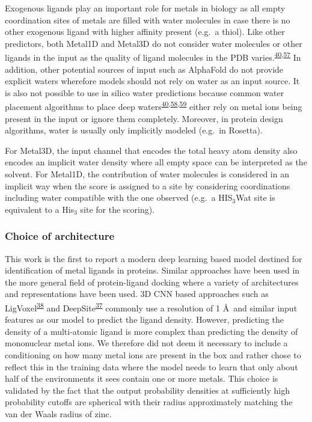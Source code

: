 \documentclass[ lineno,
  9pt]{elife}
\begin{document}
Exogenous ligands play an important role for metals in biology as all empty coordination sites of metals are filled with water molecules in case there is no other exogenous ligand with higher affinity present (e.g.~a thiol). Like other predictors, both Metal1D and Metal3D do not consider water molecules or other ligands in the input as the quality of ligand molecules in the PDB varies.\textsuperscript{\protect\hyperlink{ref-9UNjBvCL}{40},\protect\hyperlink{ref-NifwNdQd}{57}} In addition, other potential sources of input such as AlphaFold do not provide explicit waters wherefore models should not rely on water as an input source. It is also not possible to use in silico water predictions because common water placement algorithms to place deep waters\textsuperscript{\protect\hyperlink{ref-9UNjBvCL}{40},\protect\hyperlink{ref-10C4imKQR}{58},\protect\hyperlink{ref-izkvZoLX}{59}} either rely on metal ions being present in the input or ignore them completely. Moreover, in protein design algorithms, water is usually only implicitly modeled (e.g.~in Rosetta).

For Metal3D, the input channel that encodes the total heavy atom density also encodes an implicit water density where all empty space can be interpreted as the solvent. For Metal1D, the contribution of water molecules is considered in an implicit way when the score is assigned to a site by considering coordinations including water compatible with the one observed (e.g.~a HIS$_3$Wat site is equivalent to a His$_3$ site for the scoring).

\hypertarget{choice-of-architecture}{%
\subsubsection{Choice of architecture}\label{choice-of-architecture}}

This work is the first to report a modern deep learning based model destined for identification of metal ligands in proteins. Similar approaches have been used in the more general field of protein-ligand docking where a variety of architectures and representations have been used. 3D CNN based approaches such as LigVoxel\textsuperscript{\protect\hyperlink{ref-mVGaXlum}{38}} and DeepSite\textsuperscript{\protect\hyperlink{ref-Gq7n6vhH}{37}} commonly use a resolution of 1 \AA\, and similar input features as our model to predict the ligand density. However, predicting the density of a multi-atomic ligand is more complex than predicting the density of mononuclear metal ions. We therefore did not deem it necessary to include a conditioning on how many metal ions are present in the box and rather chose to reflect this in the training data where the model needs to learn that only about half of the environments it sees contain one or more metals. This choice is validated by the fact that the output probability densities at sufficiently high probability cutoffs are spherical with their radius approximately matching the van der Waals radius of zinc.
\end{document}
